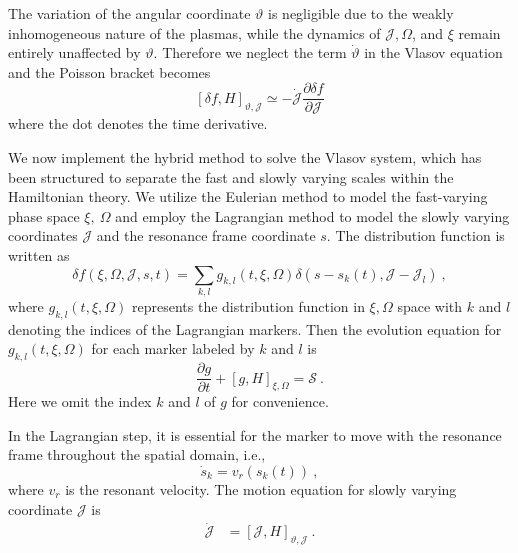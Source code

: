 \documentclass[times,12pt,3p,longtitle]{elsarticle}
\begin{document}
The variation of the angular coordinate $\vartheta$ is negligible due to the weakly inhomogeneous nature of the plasmas, while the dynamics of $\mathcal{J}, \Omega$, and $\xi$ remain entirely unaffected by $\vartheta$.
Therefore we neglect the term $ \dot{\vartheta} $ in the Vlasov equation and the  Poisson bracket becomes
\begin{equation}
\left[\delta f, H\right]_{\vartheta,\mathcal{J}}\simeq 
 -\dot{\mathcal{J}} \frac{\partial \delta f}{\partial \mathcal{J}}      
\end{equation}
where the dot denotes the time derivative.

We now implement the hybrid method to solve the Vlasov system, which has been structured to separate the fast and slowly varying scales within the Hamiltonian theory. We utilize the Eulerian method to model the fast-varying phase space $\xi,~\Omega$ and employ the Lagrangian method to model the slowly varying coordinates $\mathcal{J}$ and the resonance frame coordinate $s$.
The distribution function is written as \cite{shiroto2022}
\begin{equation}
    \delta f(\xi,\Omega,\mathcal{J},s,t) = \sum_{k,l} g_{k,l}(t,\xi,\Omega)\delta(s-s_k(t),\mathcal{J}-\mathcal{J}_l)~,
\end{equation}
where $g_{k,l}(t,\xi,\Omega)$ represents the distribution function in $\xi,\Omega$ space with $k$ and $l$ denoting the indices of the Lagrangian markers. 
Then the evolution equation for $g_{k,l}(t,\xi,\Omega)$ for each marker labeled by $k$ and $l$ is
\begin{equation}\label{eq.Euler}
\frac{\partial g}{\partial t} + \left[g,H\right]_{\xi,\Omega} = \mathcal{S}~.
\end{equation}
Here we omit the index $k$ and $l$ of $g$ for convenience.

In the Lagrangian step, it is essential for the marker to move  with the resonance frame throughout the spatial domain, i.e.,
\begin{equation}\label{eq.resonance}
        \dot{s}_k = v_r(s_k(t))~,
\end{equation}
where $v_r$ is  the  resonant velocity.
The motion equation for slowly varying coordinate $\mathcal{J}$ is
\begin{equation}
    \begin{aligned}\label{eq.Lagrangian}
        \dot{\mathcal{J}} &= \left[\mathcal{J},H\right]_{\vartheta,\mathcal{J}}~.
    \end{aligned}
\end{equation}
\end{document}
